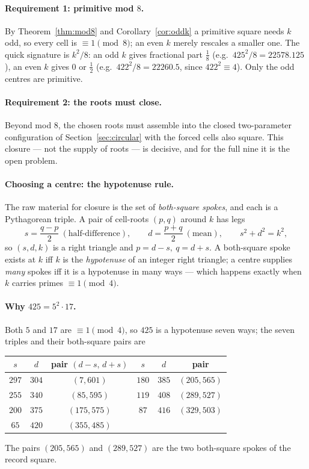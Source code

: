 \documentclass[11pt]{article}
\theoremstyle{definition}
\begin{document}
\paragraph{Requirement 1: primitive mod $8$.} By Theorem~\ref{thm:mod8} and
Corollary~\ref{cor:oddk} a primitive square needs $k$ odd, so every cell is $\equiv1\pmod8$;
an even $k$ merely rescales a smaller one. The quick signature is $k^2/8$: an odd $k$ gives
fractional part $\tfrac18$ (e.g.\ $425^2/8=22578.125$), an even $k$ gives $0$ or $\tfrac12$
(e.g.\ $422^2/8=22260.5$, since $422^2\equiv4$). Only the odd centres are primitive.

\paragraph{Requirement 2: the roots must close.} Beyond mod $8$, the chosen roots must
assemble into the closed two-parameter configuration of Section~\ref{sec:circular} with the
forced cells also square. This closure --- not the supply of roots --- is decisive, and for
the full nine it is the open problem.

\paragraph{Choosing a centre: the hypotenuse rule.} The raw material for closure is the set
of \emph{both-square spokes}, and each is a Pythagorean triple. A pair of cell-roots $(p,q)$
around $k$ has legs
\[
  s=\frac{q-p}{2}\ (\text{half-difference}),\qquad d=\frac{p+q}{2}\ (\text{mean}),
  \qquad s^2+d^2=k^2 ,
\]
so $(s,d,k)$ is a right triangle and $p=d-s,\ q=d+s$. A both-square spoke exists at $k$ iff
$k$ is the \emph{hypotenuse} of an integer right triangle; a centre supplies \emph{many}
spokes iff it is a hypotenuse in many ways --- which happens exactly when $k$ carries primes
$\equiv1\pmod4$.

\paragraph{Why $425=5^2\cdot17$.} Both $5$ and $17$ are $\equiv1\pmod4$, so $425$ is a
hypotenuse seven ways; the seven triples and their both-square pairs are
\begin{center}\small
\begin{tabular}{ccc@{\qquad}ccc}
\hline
$s$ & $d$ & pair $(d\!-\!s,\,d\!+\!s)$ & $s$ & $d$ & pair\\
\hline
$297$ & $304$ & $(7,601)$   & $180$ & $385$ & $(205,565)$\\
$255$ & $340$ & $(85,595)$  & $119$ & $408$ & $(289,527)$\\
$200$ & $375$ & $(175,575)$ & $87$  & $416$ & $(329,503)$\\
$65$  & $420$ & $(355,485)$ &       &       & \\
\hline
\end{tabular}
\end{center}
The pairs $(205,565)$ and $(289,527)$ are the two both-square spokes of the record square.
\end{document}
